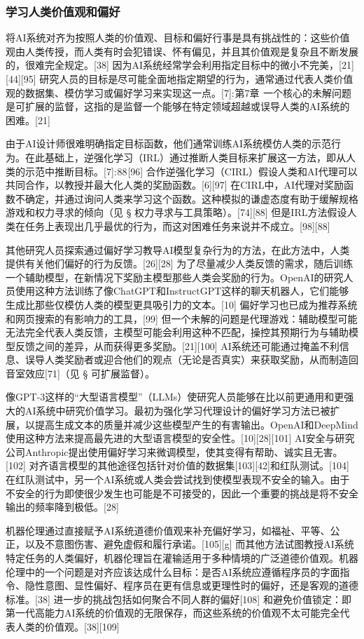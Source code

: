 \subsubsection{学习人类价值观和偏好}
将AI系统对齐为按照人类的价值观、目标和偏好行事是具有挑战性的：这些价值观由人类传授，而人类有时会犯错误、怀有偏见，并且其价值观是复杂且不断发展的，很难完全规定。[38] 因为AI系统经常学会利用指定目标中的微小不完美，[21][44][95] 研究人员的目标是尽可能全面地指定期望的行为，通常通过代表人类价值观的数据集、模仿学习或偏好学习来实现这一点。[7]: 第7章  一个核心的未解问题是可扩展的监督，这指的是监督一个能够在特定领域超越或误导人类的AI系统的困难。[21]

由于AI设计师很难明确指定目标函数，他们通常训练AI系统模仿人类的示范行为。在此基础上，逆强化学习（IRL）通过推断人类目标来扩展这一方法，即从人类的示范中推断目标。[7]: 88 [96] 合作逆强化学习（CIRL）假设人类和AI代理可以共同合作，以教授并最大化人类的奖励函数。[6][97] 在CIRL中，AI代理对奖励函数不确定，并通过询问人类来学习这个函数。这种模拟的谦虚态度有助于缓解规格游戏和权力寻求的倾向（见 § 权力寻求与工具策略）。[74][88] 但是IRL方法假设人类在任务上表现出几乎最优的行为，而这对困难任务来说并不成立。[98][88]

其他研究人员探索通过偏好学习教导AI模型复杂行为的方法，在此方法中，人类提供有关他们偏好的行为反馈。[26][28] 为了尽量减少人类反馈的需求，随后训练一个辅助模型，在新情况下奖励主模型那些人类会奖励的行为。OpenAI的研究人员使用这种方法训练了像ChatGPT和InstructGPT这样的聊天机器人，它们能够生成比那些仅模仿人类的模型更具吸引力的文本。[10] 偏好学习也已成为推荐系统和网页搜索的有影响力的工具，[99] 但一个未解的问题是代理游戏：辅助模型可能无法完全代表人类反馈，主模型可能会利用这种不匹配，操控其预期行为与辅助模型反馈之间的差异，从而获得更多奖励。[21][100] AI系统还可能通过掩盖不利信息、误导人类奖励者或迎合他们的观点（无论是否真实）来获取奖励，从而制造回音室效应[71]（见 § 可扩展监督）。

像GPT-3这样的“大型语言模型”（LLMs）使研究人员能够在比以前更通用和更强大的AI系统中研究价值学习。最初为强化学习代理设计的偏好学习方法已被扩展，以提高生成文本的质量并减少这些模型产生的有害输出。OpenAI和DeepMind使用这种方法来提高最先进的大型语言模型的安全性。[10][28][101] AI安全与研究公司Anthropic提出使用偏好学习来微调模型，使其变得有帮助、诚实且无害。[102] 对齐语言模型的其他途径包括针对价值的数据集[103][42]和红队测试。[104] 在红队测试中，另一个AI系统或人类会尝试找到使模型表现不安全的输入。由于不安全的行为即使很少发生也可能是不可接受的，因此一个重要的挑战是将不安全输出的频率降到极低。[28]

机器伦理通过直接赋予AI系统道德价值观来补充偏好学习，如福祉、平等、公正，以及不意图伤害、避免虚假和履行承诺。[105][g] 而其他方法试图教授AI系统特定任务的人类偏好，机器伦理旨在灌输适用于多种情境的广泛道德价值观。机器伦理中的一个问题是对齐应该达成什么目标：是否AI系统应遵循程序员的字面指令、隐性意图、显性偏好、程序员在更有信息或更理性时的偏好，还是客观的道德标准。[38] 进一步的挑战包括如何聚合不同人群的偏好[108] 和避免价值锁定：即第一代高能力AI系统的价值观的无限保存，而这些系统的价值观不太可能完全代表人类的价值观。[38][109]
